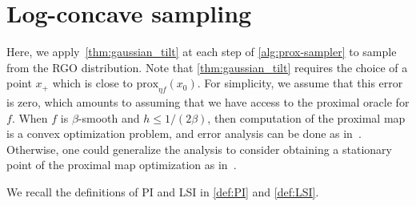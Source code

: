 \section{Log-concave sampling}\label{appdx:log-concave}


Here, we apply~\cref{thm:gaussian_tilt} at each step of \cref{alg:prox-sampler} to sample from the RGO distribution.
Note that \cref{thm:gaussian_tilt} requires the choice of a point $x_+$ which is close to $\text{prox}_{\eta f}(x_0)$.
For simplicity, we assume that this error is zero, which amounts to assuming that we have access to the proximal oracle for $f$.
When $f$ is $\beta$-smooth and $h\le 1/(2\beta)$, then computation of the proximal map is a convex optimization problem, and error analysis can be done as in~\citet{AltChe24Warm}.
Otherwise, one could generalize the analysis to consider obtaining a stationary point of the proximal map optimization as in~\citet{FanYuaChe23ImprovedProx}.

We recall the definitions of PI and LSI in \cref{def:PI} and \cref{def:LSI}.

